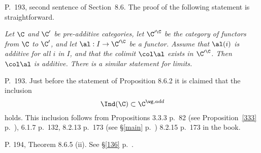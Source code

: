 \documentclass[12pt]{article}
\theoremstyle{remark}
\theoremstyle{definition}
\begin{document}
%


\begin{s} 
P.~193, second sentence of Section~8.6. The proof of the following statement is straightforward. 

\nn\emph{Let $\C$ and $\C'$ be pre-additive categories, let $\C'^\C$ be the category of functors from $\C$ to $\C'$, and let $\al:I\to\C'^\C$ be a functor. Assume that $\al(i)$ is additive for all $i$ in $I$, and that the colimit $\col\al$ exists in $\C'^\C$. Then $\col\al$ is additive. There is a similar statement for limits.}
\end{s}

%

\begin{s}
P.~193. Just before the statement of Proposition 8.6.2 it is claimed that the inclusion 
$$
\Ind(\C)\subset\C^{\wg,add}
$$ 
holds. This inclusion follows from Propositions 3.3.3 p.~82 (see Proposition~\ref{333} p.~), 6.1.7 p.~132, 8.2.13 p.~173 (see \S\ref{main} p.~) 8.2.15 p.~173 in the book.
\end{s}

%

\begin{s}
P. 194, Theorem 8.6.5 (ii). See \S\ref{136} p.~.
\end{s}

\end{document}
